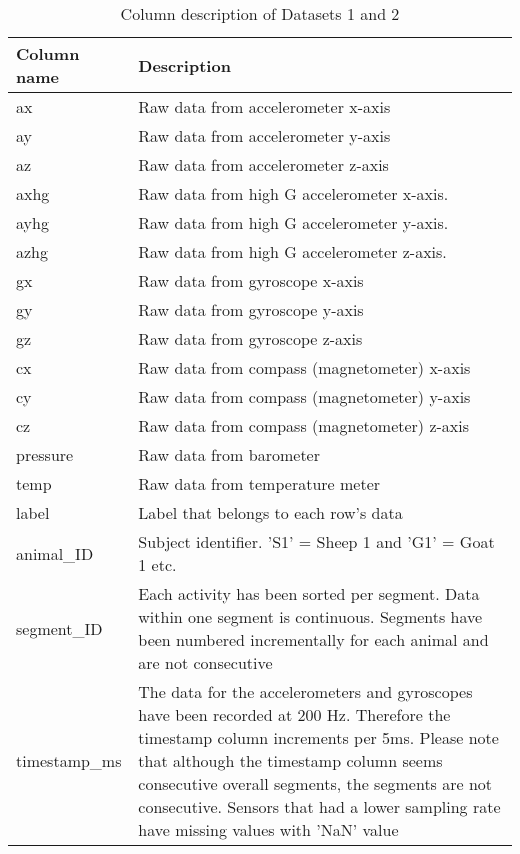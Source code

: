 \begin{table}[htb]
  \centering
  \caption{Column description of Datasets 1 and 2}
\begin{tabular}{lp{35em}}
\toprule
\multicolumn{1}{p{6.645em}}{\textbf{Column name}} & \textbf{Description} \\
\midrule
ax    & Raw data from accelerometer x-axis \\
ay    & Raw data from accelerometer y-axis \\
az    & Raw data from accelerometer z-axis \\
axhg  & Raw data from high G accelerometer x-axis. \\
ayhg  & Raw data from high G accelerometer y-axis. \\
azhg  & Raw data from high G accelerometer z-axis. \\
gx    & Raw data from gyroscope x-axis \\
gy    & Raw data from gyroscope y-axis \\
gz    & Raw data from gyroscope z-axis \\
cx    & Raw data from compass (magnetometer) x-axis \\
cy    & Raw data from compass (magnetometer) y-axis \\
cz    & Raw data from compass (magnetometer) z-axis \\
pressure & Raw data from barometer \\
temp  & Raw data from temperature meter \\
label & Label that belongs to each row's data \\
animal\_ID & Subject identifier. 'S1' = Sheep 1 and 'G1' = Goat 1 etc. \\
segment\_ID & Each activity has been sorted per segment. Data within one segment is continuous. Segments have been numbered incrementally for each animal and are not consecutive \\
timestamp\_ms & The data for the accelerometers and gyroscopes have been recorded at 200 Hz. Therefore the timestamp column increments per 5ms. Please note that although the timestamp column seems consecutive over\newline{}all segments, the segments are not consecutive. Sensors that had a lower sampling rate have missing values with 'NaN' value \\
\bottomrule
\end{tabular}%


  \label{tab:goat_sheep_data_description}%
\end{table}%





